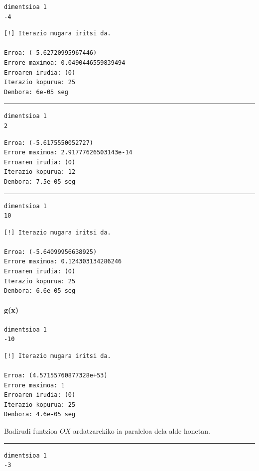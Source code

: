 \documentclass[10pt,a4paper,basque]{article}
\begin{document}
\begin{lstlisting}
dimentsioa 1
-4
\end{lstlisting}

\begin{lstlisting}
[!] Iterazio mugara iritsi da.

Erroa: (-5.62720995967446)
Errore maximoa: 0.0490446559839494
Erroaren irudia: (0)
Iterazio kopurua: 25
Denbora: 6e-05 seg
\end{lstlisting}

\rule{12cm}{0.4pt}

\begin{lstlisting}
dimentsioa 1
2
\end{lstlisting}

\begin{lstlisting}
Erroa: (-5.6175550052727)
Errore maximoa: 2.91777626503143e-14
Erroaren irudia: (0)
Iterazio kopurua: 12
Denbora: 7.5e-05 seg
\end{lstlisting}

\rule{12cm}{0.4pt}

\begin{lstlisting}
dimentsioa 1
10
\end{lstlisting}

\begin{lstlisting}
[!] Iterazio mugara iritsi da.

Erroa: (-5.64099956638925)
Errore maximoa: 0.124303134286246
Erroaren irudia: (0)
Iterazio kopurua: 25
Denbora: 6.6e-05 seg
\end{lstlisting}

\paragraph{g(x)}

\begin{lstlisting}
dimentsioa 1
-10
\end{lstlisting}

\begin{lstlisting}
[!] Iterazio mugara iritsi da.

Erroa: (4.57155760877328e+53)
Errore maximoa: 1
Erroaren irudia: (0)
Iterazio kopurua: 25
Denbora: 4.6e-05 seg
\end{lstlisting}

Badirudi funtzioa $OX$ ardatzarekiko ia paraleloa dela alde honetan.

\rule{12cm}{0.4pt}

\begin{lstlisting}
dimentsioa 1
-3
\end{lstlisting}
\end{document}
